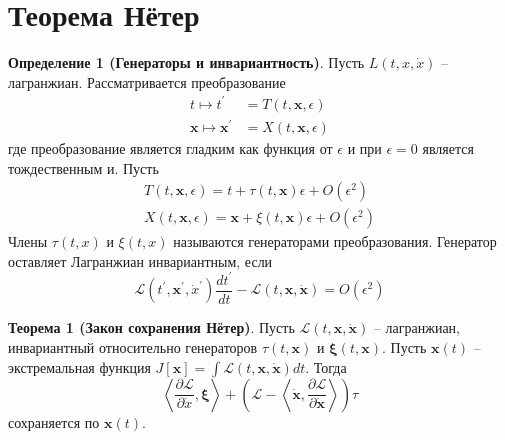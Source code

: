 \documentclass[12pt]{article}
\begin{document}
	
	\section{Теорема Нётер}
	\textbf{Определение 1 (Генераторы и инвариантность)}. Пусть $L(t, x,\dot{x})$ -- лагранжиан. Рассматривается преобразование 
	\begin{equation}
	\begin{aligned}
	t \mapsto t^{\prime} &=T(t, \boldsymbol{x}, \epsilon) \\
	\boldsymbol{x} \mapsto \boldsymbol{x}^{\prime} &=X(t, \boldsymbol{x}, \epsilon)
	\end{aligned}
	\end{equation}
	где преобразование является гладким как функция от $\epsilon$ и при $\epsilon= 0$ является тождественным и. Пусть
	\begin{equation}
	\begin{array}{l}
	T(t, \boldsymbol{x}, \epsilon)=t+\tau(t, \boldsymbol{x}) \epsilon+O\left(\epsilon^{2}\right) \\
	X(t, \boldsymbol{x}, \epsilon)=\boldsymbol{x}+\xi(t, \boldsymbol{x}) \epsilon+O\left(\epsilon^{2}\right)
	\end{array}
	\end{equation}
	Члены $\tau (t, x)$ и $\xi (t, x)$ называются генераторами преобразования. Генератор оставляет Лагранжиан инвариантным, если
	\begin{equation}
	\mathcal{L}\left(t^{\prime}, \boldsymbol{x}^{\prime}, \dot{x}^{\prime}\right) \frac{d t^{\prime}}{d t}-\mathcal{L}(t, \boldsymbol{x}, \dot{\boldsymbol{x}})=O\left(\epsilon^{2}\right)
	\end{equation}
	
	\textbf{Теорема 1 (Закон сохранения Нётер)}.
	Пусть $\mathcal{L}(t, \boldsymbol{x}, \dot{\boldsymbol{x}})$ -- лагранжиан, инвариантный относительно генераторов $\tau(t, \boldsymbol{x})$ и $\boldsymbol{\xi}(t, \boldsymbol{x})$. Пусть $\boldsymbol{x}(t)$ -- экстремальная функция $J[\boldsymbol{x}]=\int \mathcal{L}(t, \boldsymbol{x}, \dot{\boldsymbol{x}}) d t$. Тогда
	$$
	\left\langle\frac{\partial \mathcal{L}}{\partial \dot{x}}, \boldsymbol{\xi}\right\rangle+\left(\mathcal{L}-\left\langle\dot{\boldsymbol{x}}, \frac{\partial \mathcal{L}}{\partial \dot{\boldsymbol{x}}}\right\rangle\right) \tau
	$$
	сохраняется по $\boldsymbol{x}(t)$.
	
\end{document}
